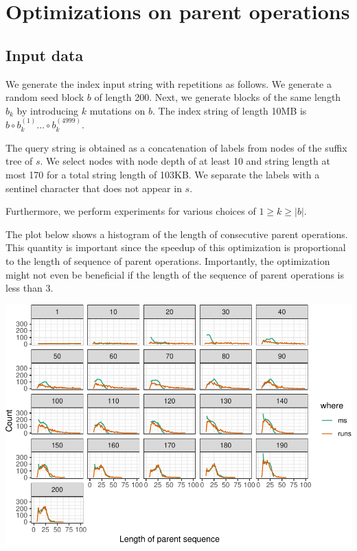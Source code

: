 \documentclass[]{article}
\begin{document}
\section{Optimizations on parent
operations}\label{optimizations-on-parent-operations}

\subsection{Input data}\label{input-data-1}

We generate the index input string with repetitions as follows. We
generate a random seed block \(b\) of length 200. Next, we generate
blocks of the same length \(b_k\) by introducing \(k\) mutations on
\(b\). The index string of length 10MB is
\(b\circ b_k^{(1)} \ldots \circ b_k^{(4999)}\).

The query string is obtained as a concatenation of labels from nodes of
the suffix tree of \(s\). We select nodes with node depth of at least 10
and string length at most 170 for a total string length of 103KB. We
separate the labels with a sentinel character that does not appear in
\(s\).

Furthermore, we perform experiments for various choices of
\(1 \geq k \geq |b|\).

The plot below shows a histogram of the length of consecutive parent
operations. This quantity is important since the speedup of this
optimization is proportional to the length of sequence of parent
operations. Importantly, the optimization might not even be beneficial
if the length of the sequence of parent operations is less than 3.

\includegraphics{sea_2018_files/figure-latex/unnamed-chunk-1-1.pdf}
\end{document}
